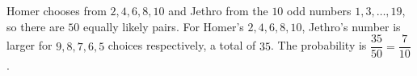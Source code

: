 Homer chooses from $2,4,6,8,10$ and Jethro from the $10$ odd numbers $1,3,\dots,19$, so there are $50$ equally likely pairs. For Homer's $2,4,6,8,10$, Jethro's number is larger for $9,8,7,6,5$ choices respectively, a total of $35$. The probability is $\dfrac{35}{50}=\boxed{\dfrac{7}{10}}$.
